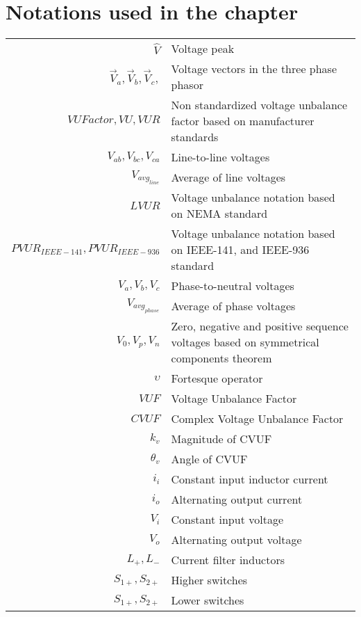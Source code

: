 
\section*{Notations used in the chapter}

\begin{scriptsize}
\begin{tabularx}{\textwidth}{r|X}


	$\hat{V}$															& Voltage peak\\
	$\vec{V}_a, \vec{V}_b, \vec{V}_c,$										& Voltage vectors in the three phase phasor\\
  $VUFactor,VU,VUR$                	& Non standardized voltage unbalance factor based on manufacturer standards\\
	$V_{ab},V_{bc},V_{ca}$  					& Line-to-line voltages\\
	$V_{avg_{line}}$  								& Average of line voltages\\
	$LVUR$														& Voltage unbalance notation based on NEMA standard\\
	$PVUR_{IEEE-141},PVUR_{IEEE-936}$	& Voltage unbalance notation based on IEEE-141, and IEEE-936 standard\\
	$V_{a},V_{b},V_{c}$  							& Phase-to-neutral voltages\\
	$V_{avg_{phase}}$  								& Average of phase voltages\\
	$V_{0},V_{p},V_{n}$  							& Zero, negative and positive sequence voltages based on symmetrical components theorem\\
  $\upsilon$  											& Fortesque operator\\
	$VUF$  														& Voltage Unbalance Factor\\
	$CVUF$  													& Complex Voltage Unbalance Factor\\
	$k_v$  														& Magnitude of CVUF\\
	$\theta_v$  											& Angle of CVUF\\
	$i_i$															& Constant input inductor current\\
	$i_o$															& Alternating output current\\
	$V_i$															& Constant input voltage\\
	$V_o$															& Alternating output voltage\\
	$L_+,L_-$													& Current filter inductors\\
	$S_{1+},S_{2+}$										& Higher switches\\
	$S_{1+},S_{2+}$										& Lower switches\\

\end{tabularx}
\end{scriptsize}
